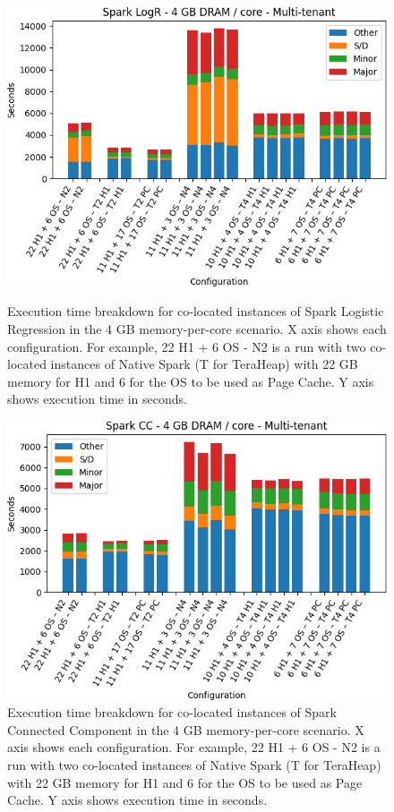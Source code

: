\begin{figure}[thbp]
        \centering
    \includegraphics[width=\linewidth]{./fig/logr64.png}
    \caption{Execution time breakdown for co-located instances of Spark
    Logistic Regression in the 4 GB memory-per-core scenario. X axis shows each configuration.
        For example, 22 H1 + 6 OS - N2 is a run with two co-located instances of Native Spark (T for TeraHeap) with 22 GB memory for H1 and 6 for the OS to be used as Page Cache. Y axis shows execution time in seconds.}
    \label{fig:logr64}

    \includegraphics[width=\linewidth]{./fig/cc64.png}
    \caption{Execution time breakdown for co-located instances of Spark
    Connected Component in the 4 GB memory-per-core scenario. X axis shows each configuration.
        For example, 22 H1 + 6 OS - N2 is a run with two co-located instances of Native Spark (T for TeraHeap) with 22 GB memory for H1 and 6 for the OS to be used as Page Cache. Y axis shows execution time in seconds.}
    \label{fig:cc64}
\end{figure}

